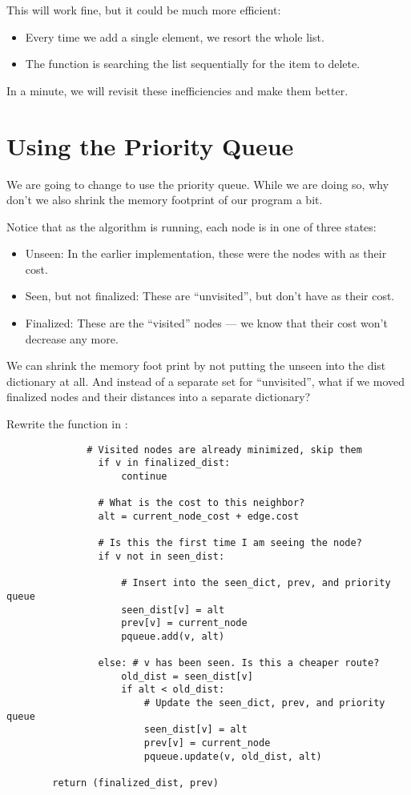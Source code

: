 This will work fine, but it could be much more efficient:
\begin{itemize}
\item Every time we add a single element, we resort the whole list.
\item The function  is searching the list sequentially for the item to delete.
\end{itemize}

In a minute, we will revisit these inefficiencies and make them better.

\section{Using the Priority Queue}

We are going to change  to use the priority
queue. While we are doing so, why don't we also shrink the memory
footprint of our program a bit.

Notice that as the algorithm is running, each node is in one of three states:
\begin{itemize}
\item Unseen: In the earlier implementation, these were the nodes with  as their cost.
\item Seen, but not finalized: These are ``unvisited'', but don't have  as their cost.
\item Finalized: These are the ``visited'' nodes --- we know that their cost won't decrease any more.
\end{itemize}

We can shrink the memory foot print by not putting the unseen into the
dist dictionary at all. And instead of a separate set for
``unvisited'', what if we moved finalized nodes and their distances
into a separate dictionary?

Rewrite the  function in :

\begin{verbatim}
              # Visited nodes are already minimized, skip them
                if v in finalized_dist:
                    continue

                # What is the cost to this neighbor?
                alt = current_node_cost + edge.cost

                # Is this the first time I am seeing the node?
                if v not in seen_dist:

                    # Insert into the seen_dict, prev, and priority queue
                    seen_dist[v] = alt
                    prev[v] = current_node
                    pqueue.add(v, alt)

                else: # v has been seen. Is this a cheaper route?
                    old_dist = seen_dist[v]
                    if alt < old_dist:
                        # Update the seen_dict, prev, and priority queue
                        seen_dist[v] = alt
                        prev[v] = current_node
                        pqueue.update(v, old_dist, alt)

        return (finalized_dist, prev)
\end{verbatim}

